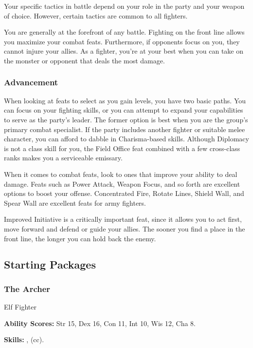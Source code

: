 Your specific tactics in battle depend on your role in the party and your weapon of choice. However, certain tactics are common to all fighters.

You are generally at the forefront of any battle. Fighting on the front line allows you maximize your combat feats. Furthermore, if opponents focus on you, they cannot injure your allies. As a fighter, you're at your best when you can take on the monster or opponent that deals the most damage.

\subsubsection{Advancement}

When looking at feats to select as you gain levels, you have two basic paths. You can focus on your fighting skills, or you can attempt to expand your capabilities to serve as the party's leader. The former option is best when you are the group's primary combat specialist. If the party includes another fighter or suitable melee character, you can afford to dabble in Charisma-based skills. Although Diplomacy is not a class skill for you, the Field Office feat combined with a few cross-class ranks makes you a serviceable emissary.

When it comes to combat feats, look to ones that improve your ability to deal damage. Feats such as Power Attack, Weapon Focus, and so forth are excellent options to boost your offense. Concentrated Fire, Rotate Lines, Shield Wall, and Spear Wall are excellent feats for army fighters.

Improved Initiative is a critically important feat, since it allows you to act first, move forward and defend or guide your allies. The sooner you find a place in the front line, the longer you can hold back the enemy.

\subsection{Starting Packages}

\subsubsection{The Archer}
Elf Fighter

\textbf{Ability Scores:} Str 15, Dex 16, Con 11, Int 10, Wis 12, Cha 8.

\textbf{Skills:} ,  (cc).


